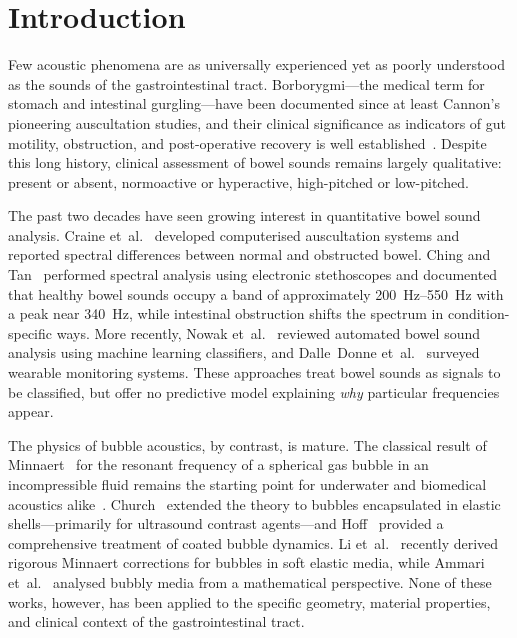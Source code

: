 \documentclass[review]{elsarticle}
\begin{document}
\section{Introduction}
\label{sec:introduction}

Few acoustic phenomena are as universally experienced yet as poorly understood
as the sounds of the gastrointestinal tract.  Borborygmi---the medical term
for stomach and intestinal gurgling---have been documented since at least
Cannon's~\cite{Cannon1905} pioneering auscultation studies, and their
clinical significance as indicators of gut motility, obstruction, and
post-operative recovery is well established~\cite{Ching2012, Craine1999,
DalleDonne2024}.  Despite this long history, clinical assessment of bowel
sounds remains largely qualitative: present or absent, normoactive or
hyperactive, high-pitched or low-pitched.

The past two decades have seen growing interest in quantitative bowel sound
analysis.  Craine et~al.~\cite{Craine1999, Craine2002} developed
computerised auscultation systems and reported spectral differences between
normal and obstructed bowel.  Ching and Tan~\cite{Ching2012} performed
spectral analysis using electronic stethoscopes and documented that healthy
bowel sounds occupy a band of approximately \SIrange{200}{550}{\hertz} with
a peak near \SI{340}{\hertz}, while intestinal obstruction shifts the
spectrum in condition-specific ways.  More recently, Nowak
et~al.~\cite{Nowak2021} reviewed automated bowel sound analysis using machine
learning classifiers, and Dalle~Donne et~al.~\cite{DalleDonne2024} surveyed
wearable monitoring systems.  These approaches treat bowel sounds as signals
to be classified, but offer no predictive model explaining \emph{why}
particular frequencies appear.

The physics of bubble acoustics, by contrast, is mature.  The
classical result of Minnaert~\cite{Minnaert1933} for the resonant frequency
of a spherical gas bubble in an incompressible fluid remains the starting
point for underwater and biomedical acoustics alike~\cite{Leighton1994}.
Church~\cite{Church1995} extended the theory to bubbles encapsulated in
elastic shells---primarily for ultrasound contrast agents---and
Hoff~\cite{Hoff2001} provided a comprehensive treatment of coated bubble
dynamics.  Li et~al.~\cite{Li2022} recently derived rigorous Minnaert
corrections for bubbles in soft elastic media, while Ammari
et~al.~\cite{Ammari2018} analysed bubbly media from a mathematical
perspective.  None of these works, however, has been applied to the specific
geometry, material properties, and clinical context of the gastrointestinal
tract.
\end{document}
